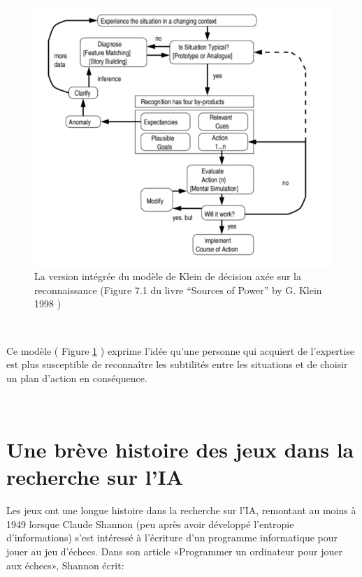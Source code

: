 \begin{figure}[th]
\centering
\includegraphics{Figures/klein.PNG}
\decoRule
\caption[ La version intégrée  du modèle de Klein de décision axée sur la reconnaissance] { La version intégrée  du modèle de Klein de décision axée sur la reconnaissance
(Figure 7.1 du livre “Sources of Power” by G. Klein 1998 \parencite{klein2017sources}) }
\label{fig:klein}
\end{figure}


~\par
Ce modèle ( Figure \ref{fig:klein} ) exprime l’idée qu’une personne qui acquiert de l’expertise est plus susceptible 
de reconnaître les subtilités entre les situations et de choisir un plan d’action en conséquence.



~\par

\section{Une brève histoire des jeux dans la recherche sur l'IA}

Les jeux ont une longue histoire dans la recherche sur l'IA, remontant au moins à 1949 lorsque Claude Shannon (peu après avoir développé l'entropie d'informations) s'est intéressé à l'écriture d'un programme informatique pour jouer au jeu d'échecs. Dans son article «Programmer un ordinateur pour jouer aux échecs», Shannon écrit:

